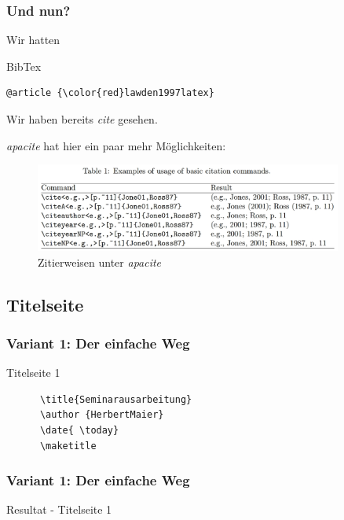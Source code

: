 \begin{frame}[fragile]
  \frametitle{Und nun?}
  \pause
  Wir hatten
  \begin{block}{BibTex}
    \begin{Verbatim}[commandchars=\\\{\}]
@article {\color{red}lawden1997latex}
    \end{Verbatim}
  \end{block}
  \pause
  \begin{example}
    Wir haben bereits \textit{cite} gesehen.

    \textit{apacite} hat hier ein paar mehr Möglichkeiten:

    \begin{figure}
      \centering
      \includegraphics[width = 0.9\textwidth]{images/Auswahl_047.eps}
      \caption{Zitierweisen unter \textit{apacite}}
    \end{figure}

  \end{example}
\end{frame}

\subsection{Titelseite}

\begin{frame}[fragile]
  \frametitle{Variant 1: Der einfache Weg}

  \begin{block}{Titelseite 1}
    \begin{verbatim}
      \title{Seminarausarbeitung}
      \author {HerbertMaier}
      \date{ \today}
      \maketitle
    \end{verbatim}
  \end{block}
\end{frame}
\begin{frame}
  \frametitle{Variant 1: Der einfache Weg}

  \begin{block}{Resultat - Titelseite 1}
  \end{block}
\end{frame}

